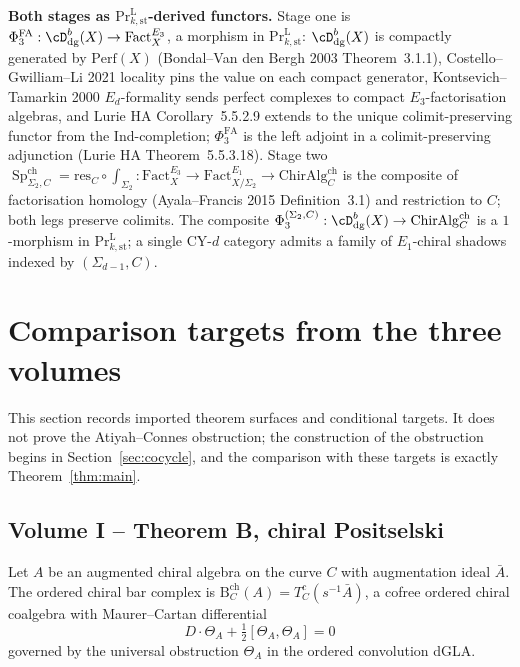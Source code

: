 \documentclass[11pt,reqno]{amsart}
\theoremstyle{plain}
\theoremstyle{definition}
\theoremstyle{remark}
\DeclareMathOperator{\Sp}{Sp}
\newcommand{\Bar}{\mathrm{B}}
\begin{document}
\medskip
\noindent\textbf{Both stages as $\mathrm{Pr}^{\mathrm{L}}_{k,\mathrm{st}}$-derived functors.} Stage one is $\Phi^{\mathrm{FA}}_3 : \cD^{b}_{\mathrm{dg}}(X) \to \mathrm{Fact}^{E_3}_X$, a morphism in $\mathrm{Pr}^{\mathrm{L}}_{k,\mathrm{st}}$: $\cD^{b}_{\mathrm{dg}}(X)$ is compactly generated by $\mathrm{Perf}(X)$ (Bondal--Van den Bergh 2003 Theorem~3.1.1), Costello--Gwilliam--Li 2021 locality pins the value on each compact generator, Kontsevich--Tamarkin 2000 $E_d$-formality sends perfect complexes to compact $E_3$-factorisation algebras, and Lurie $\mathrm{HA}$ Corollary~5.5.2.9 extends to the unique colimit-preserving functor from the Ind-completion; $\Phi^{\mathrm{FA}}_3$ is the left adjoint in a colimit-preserving adjunction (Lurie $\mathrm{HA}$ Theorem~5.5.3.18). Stage two $\Sp^{\mathrm{ch}}_{\Sigma_2, C} = \mathrm{res}_C \circ \int_{\Sigma_2} : \mathrm{Fact}^{E_3}_X \to \mathrm{Fact}^{E_1}_{X/\Sigma_2} \to \mathrm{ChirAlg}^{\mathrm{ch}}_C$ is the composite of factorisation homology (Ayala--Francis 2015 Definition~3.1) and restriction to $C$; both legs preserve colimits. The composite $\Phi_3^{(\Sigma_2,C)} : \cD^{b}_{\mathrm{dg}}(X) \to \mathrm{ChirAlg}^{\mathrm{ch}}_C$ is a $1$-morphism in $\mathrm{Pr}^{\mathrm{L}}_{k,\mathrm{st}}$; a single CY-$d$ category admits a family of $E_1$-chiral shadows indexed by $(\Sigma_{d-1}, C)$.

\section{Comparison targets from the three volumes}
\label{sec:climaxes}

This section records imported theorem surfaces and conditional targets.
It does not prove the Atiyah--Connes obstruction; the construction of
the obstruction begins in Section~\ref{sec:cocycle}, and the comparison
with these targets is exactly Theorem~\ref{thm:main}.

\subsection{Volume I -- Theorem B, chiral Positselski}
Let $A$ be an augmented chiral algebra on the curve $C$ with augmentation ideal $\bar A$. The ordered chiral bar complex is $\Bar^{\mathrm{ch}}_C(A) = T^c_C(s^{-1}\bar A)$, a cofree ordered chiral coalgebra with Maurer--Cartan differential
\[
  D \cdot \Theta_A + \tfrac{1}{2}[\Theta_A, \Theta_A] = 0
\]
governed by the universal obstruction $\Theta_A$ in the ordered convolution dGLA.
\end{document}
